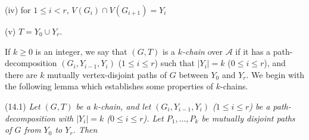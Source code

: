 \hspace*{12pt}(iv) for $1 \le i < r$, $V(G_i) \cap V(G_{i+1}) = Y_i$

\hspace*{12pt}(v) $T = Y_0 \cup Y_r$.

If $k \ge 0$ is an integer, we say that $(G, T)$ is a \textit{$k$-chain} over $\mathcal{A}$ if it has a path-decomposition $(G_i, Y_{i-1}, Y_i)$ ($1 \le i \le r$) such that $|Y_i| = k$ ($0 \le i \le r$), and there are $k$ mutually vertex-disjoint paths of $G$ between $Y_0$ and $Y_r$. We begin with the following lemma which establishes some properties of $k$-chains.

\stmt
(14.1) \textit{Let $(G, T)$ be a $k$-chain, and let $(G_i, Y_{i-1}, Y_i)$ ($1 \le i \le r$) be a path-decomposition with $|Y_i| = k$ ($0 \le i \le r$). Let $P_1, \dots, P_k$ be mutually disjoint paths of $G$ from $Y_0$ to $Y_r$. Then}
